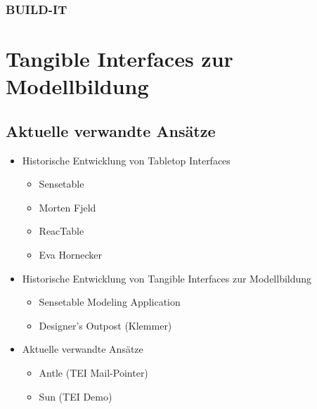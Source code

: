\subsubsection{BUILD-IT} %
\label{par:build_it}
\citep{Fjeld01}

\section{Tangible Interfaces zur Modellbildung} %
\label{sub:tangible_interfaces_zur_modellbildung}


\subsection{Aktuelle verwandte Ansätze} %
\label{sub:aktuelle_verwandte_ansätze}

\begin{itemize}
	\item Historische Entwicklung von Tabletop Interfaces
	\begin{itemize}
		\item Sensetable
		\item Morten Fjeld
		\item ReacTable
		\item Eva Hornecker
	\end{itemize}
	\item Historische Entwicklung von Tangible Interfaces zur Modellbildung
	\begin{itemize}
		\item Sensetable Modeling Application
		\item Designer's Outpost (Klemmer)
	\end{itemize}
	\item Aktuelle verwandte Ansätze
	\begin{itemize}
		\item Antle (TEI Mail-Pointer)
		\item Sun (TEI Demo)
	\end{itemize}
\end{itemize}



